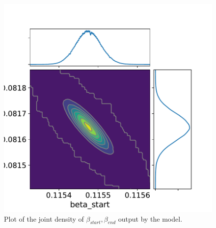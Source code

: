 \documentclass[11pt]{article}
\begin{document}
    \begin{figure}
        \centering
        \includegraphics[scale=0.75]{model_joint_betas}
        \caption{Plot of the joint density of $\beta_{start},\beta_{end}$ output by the model.}
        \label{model_joint_betas}
    \end{figure}
\end{document}
